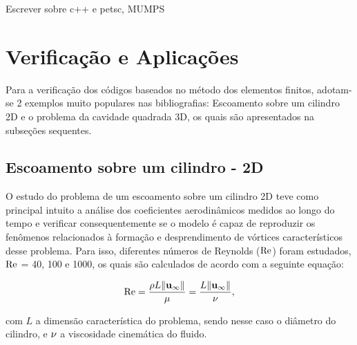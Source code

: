 \documentclass[tese_patricia]{subfiles}%
\begin{document}
Escrever sobre c++ e petsc, MUMPS


\section{Verificação e Aplicações}

Para a verificação dos códigos baseados no método dos elementos finitos, adotam-se 2 exemplos muito populares nas bibliografias: Escoamento sobre um cilindro 2D e o problema da cavidade quadrada 3D, os quais são apresentados na subseções sequentes.

\subsection{Escoamento sobre um cilindro - 2D} \label{subsection:escoamentocil2d}

O estudo do problema de um escoamento sobre um cilindro 2D teve como principal intuito a análise dos coeficientes aerodinâmicos medidos ao longo do tempo e verificar consequentemente se o modelo é capaz de reproduzir os fenômenos relacionados à formação e desprendimento de vórtices característicos desse problema. Para isso, diferentes números de Reynolds ($\mathrm{Re}$) foram estudados, $\mathrm{Re}$ = 40, 100 e 1000, os quais são calculados de acordo com a seguinte equação:

\begin{align}
	\mathrm{Re} = \frac{\rho L \lVert\mathbf{u}_{\infty}\lVert}{\mu} = \frac{L \lVert \mathbf{u}_{\infty} \lVert}{\nu}, \label{eq:Reynolds}
\end{align}

\noindent com $L$ a dimensão característica do problema, sendo nesse caso o diâmetro do cilindro, e $\nu$ a viscosidade cinemática do fluido. 
\end{document}

